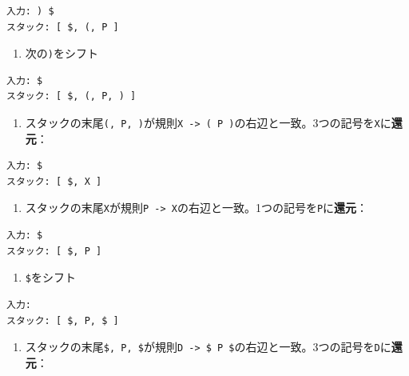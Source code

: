 \begin{verbatim}
入力: ) $
スタック: [ $, (, P ]
\end{verbatim}

\begin{enumerate}
\def\labelenumi{\arabic{enumi}.}
\setcounter{enumi}{6}
\tightlist
\item
  次の\texttt{)}をシフト
\end{enumerate}

\begin{verbatim}
入力: $
スタック: [ $, (, P, ) ]
\end{verbatim}

\begin{enumerate}
\def\labelenumi{\arabic{enumi}.}
\setcounter{enumi}{7}
\tightlist
\item
  スタックの末尾\texttt{(,\ P,\ )}が規則\texttt{X\ -\textgreater{}\ (\ P\ )}の右辺と一致。3つの記号を\texttt{X}に\textbf{還元}：
\end{enumerate}

\begin{verbatim}
入力: $
スタック: [ $, X ]
\end{verbatim}

\begin{enumerate}
\def\labelenumi{\arabic{enumi}.}
\setcounter{enumi}{8}
\tightlist
\item
  スタックの末尾\texttt{X}が規則\texttt{P\ -\textgreater{}\ X}の右辺と一致。1つの記号を\texttt{P}に\textbf{還元}：
\end{enumerate}

\begin{verbatim}
入力: $
スタック: [ $, P ]
\end{verbatim}

\begin{enumerate}
\def\labelenumi{\arabic{enumi}.}
\setcounter{enumi}{9}
\tightlist
\item
  \texttt{\$}をシフト
\end{enumerate}

\begin{verbatim}
入力:
スタック: [ $, P, $ ]
\end{verbatim}

\begin{enumerate}
\def\labelenumi{\arabic{enumi}.}
\setcounter{enumi}{10}
\tightlist
\item
  スタックの末尾\texttt{\$,\ P,\ \$}が規則\texttt{D\ -\textgreater{}\ \$\ P\ \$}の右辺と一致。3つの記号を\texttt{D}に\textbf{還元}：
\end{enumerate}

